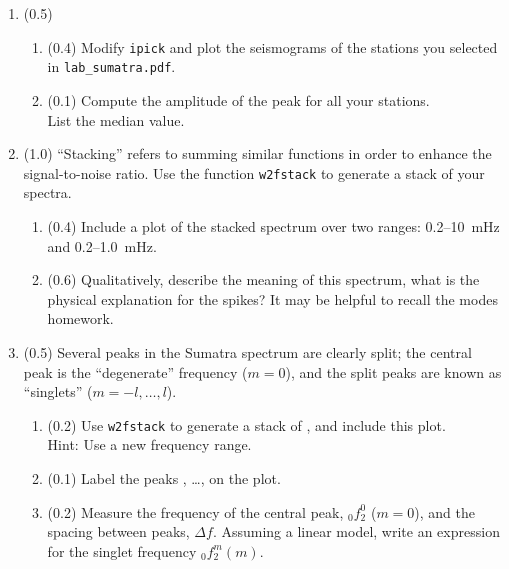 \documentclass[11pt,titlepage,fleqn]{article}
\begin{document}
\begin{enumerate}

\item (0.5)
%
\begin{enumerate}
\item (0.4) Modify \verb+ipick+ and plot the seismograms of the stations you selected in \verb+lab_sumatra.pdf+.

\item (0.1) Compute the amplitude of the  peak for all your stations. \\
List the median value.
\end{enumerate}


\item (1.0) ``Stacking'' refers to summing similar functions in order to enhance the signal-to-noise ratio. Use the function \verb+w2fstack+ to generate a stack of your spectra.
%
\begin{enumerate}
\item (0.4) Include a plot of the stacked spectrum over two ranges: 0.2--10~mHz and 0.2--1.0~mHz.
\item (0.6) Qualitatively, describe the meaning of this spectrum, \eg what is the physical explanation for the spikes? It may be helpful to recall the modes homework.
\end{enumerate}
%


\item (0.5) Several peaks in the Sumatra spectrum are clearly split; the central peak is the ``degenerate'' frequency ($m=0$), and the split peaks are known as ``singlets'' ($m = -l,\ldots,l$). 
%
\begin{enumerate}
\item (0.2) Use \verb+w2fstack+ to generate a stack of , and include this plot. \\
Hint: Use a new frequency range.
\item (0.1) Label the peaks , \ldots,  on the plot.
\item (0.2) Measure the frequency of the central peak, $_0f_2^0$ ($m=0$), and the spacing between peaks, $\Delta f$.
Assuming a linear model, write an expression for the singlet frequency $_0f_2^m(m)$.
\end{enumerate}



\end{enumerate}
\end{document}
